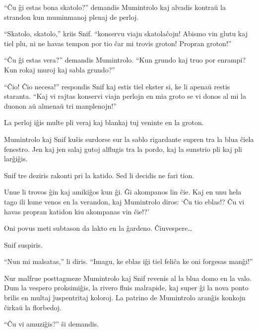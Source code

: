``Ĉu ĝi estas bona skatolo?'' demandis Mumintrolo kaj alvadis kontraŭ la strandon kun muminmanoj plenaj de perloj.

``Skatolo, skatolo,'' kriis Snif. ``konservu viajn skatolaĉojn! Abismo vin glutu kaj tiel plu, ni ne havas tempon por tio ĉar mi trovis groton! Propran groton!''

``Ĉu ĝi estas vera?'' demandis Mumintrolo. ``Kun grundo kaj truo por enrampi? Kun rokaj muroj kaj sabla grundo?''

``Ĉio! Ĉio necesa!'' respondis Snif kaj estis tiel ekster si, ke li apenaŭ restis staranta. ``Kaj vi rajtas konservi viajn perlojn en mia groto se vi donos al mi la duonon aŭ almenaŭ tri manplenojn!''

\sectionbreak

La perloj iĝis multe pli veraj kaj blankaj tuj veninte en la groton.

Mumintrolo kaj Snif kuŝis surdorse sur la sablo rigardante supren tra la blua ĉiela fenestro. Jen kaj jen salaj gutoj alflugis tra la pordo, kaj la sunstrio pli kaj pli larĝiĝis.

Snif tre deziris rakonti pri la katido. Sed li decidis ne fari tion.

Unue li trovos ĝin kaj amikiĝos kun ĝi. Ĝi akompanos lin ĉie. Kaj en unu hela tago ili kune venos en la verandon, kaj Mumintrolo diros: `Ĉu tio eblas!? Ĉu vi havas propran katidon kiu akompanas vin ĉie!?'

Oni povus meti subtason da lakto en la ĝardeno. Ĉiuvespere{\ldots}

Snif suspiris.

``Nun mi malsatas,'' li diris. ``Imagu, ke eblas iĝi tiel feliĉa ke oni forgesas manĝi!''

\sectionbreak

Nur malfrue posttagmeze Mumintrolo kaj Snif revenis al la blua domo en la valo. Dum la vespero proksimiĝis, la rivero fluis malrapide, kaj super ĝi la nova ponto brilis en multaj ĵuspentritaj koloroj. La patrino de Mumintrolo aranĝis konkojn ĉirkaŭ la florbedoj.

``Ĉu vi amuziĝis?'' ŝi demandis.

